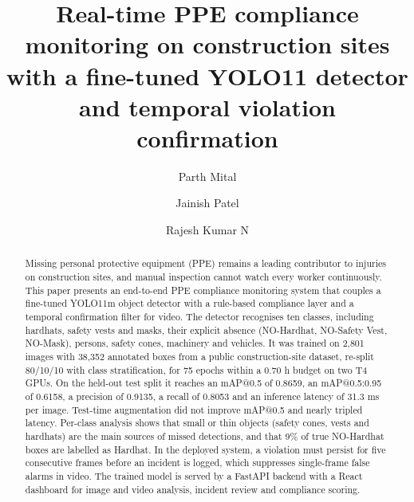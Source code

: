 \documentclass[preprint,12pt]{elsarticle}
\begin{document}
\begin{frontmatter}

\title{Real-time PPE compliance monitoring on construction sites with a fine-tuned YOLO11 detector and temporal violation confirmation}

\author[scope]{Parth Mital}
\author[scope]{Jainish Patel}
\author[iot]{Rajesh Kumar N}


\begin{abstract}
Missing personal protective equipment (PPE) remains a leading contributor to injuries on construction sites, and manual inspection cannot watch every worker continuously. This paper presents an end-to-end PPE compliance monitoring system that couples a fine-tuned YOLO11m object detector with a rule-based compliance layer and a temporal confirmation filter for video. The detector recognises ten classes, including hardhats, safety vests and masks, their explicit absence (NO-Hardhat, NO-Safety Vest, NO-Mask), persons, safety cones, machinery and vehicles. It was trained on 2,801 images with 38,352 annotated boxes from a public construction-site dataset, re-split 80/10/10 with class stratification, for 75 epochs within a 0.70 h budget on two T4 GPUs. On the held-out test split it reaches an mAP@0.5 of 0.8659, an mAP@0.5:0.95 of 0.6158, a precision of 0.9135, a recall of 0.8053 and an inference latency of 31.3 ms per image. Test-time augmentation did not improve mAP@0.5 and nearly tripled latency. Per-class analysis shows that small or thin objects (safety cones, vests and hardhats) are the main sources of missed detections, and that 9\% of true NO-Hardhat boxes are labelled as Hardhat. In the deployed system, a violation must persist for five consecutive frames before an incident is logged, which suppresses single-frame false alarms in video. The trained model is served by a FastAPI backend with a React dashboard for image and video analysis, incident review and compliance scoring.
\end{abstract}


\end{frontmatter}
\end{document}
